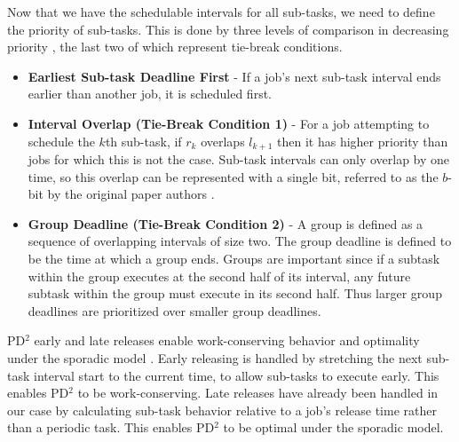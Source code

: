 \documentclass[conference,compsoc]{IEEEtran}
\begin{document}
Now that we have the schedulable intervals for all sub-tasks, we need to define the priority of sub-tasks. This is done by three levels of comparison in decreasing priority \cite{pd2}, the last two of which represent tie-break conditions.
\begin{itemize}
    \item \textbf{Earliest Sub-task Deadline First} - If a job's next sub-task interval ends earlier than another job, it is scheduled first.
    \item \textbf{Interval Overlap (Tie-Break Condition 1)} - For a job attempting to schedule the $k$th sub-task, if $r_k$ overlaps $l_{k+1}$ then it has higher priority than jobs for which this is not the case. Sub-task intervals can only overlap by one time, so this overlap can be represented with a single bit, referred to as the $b$-bit by the original paper authors \cite{pd2}.
    \item \textbf{Group Deadline (Tie-Break Condition 2)} - A group is defined as a sequence of overlapping intervals of size two. The group deadline is defined to be the time at which a group ends. Groups are important since if a subtask within the group executes at the second half of its interval, any future subtask within the group must execute in its second half. Thus larger group deadlines are prioritized over smaller group deadlines.
\end{itemize}
PD$^2$ early and late releases enable work-conserving behavior and optimality under the sporadic model \cite{pd2}. Early releasing is handled by stretching the next sub-task interval start to the current time, to allow sub-tasks to execute early. This enables PD$^2$ to be work-conserving. Late releases have already been handled in our case by calculating sub-task behavior relative to a job's release time rather than a periodic task. This enables PD$^2$ to be optimal under the sporadic model.
\end{document}
